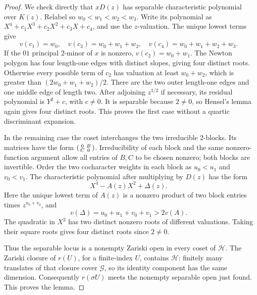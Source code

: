 \begin{proof}
We check directly that \(xD(z)\) has separable characteristic
polynomial over \(K(z)\).
Relabel so \(w_0<w_1<w_2<w_3\).
Write its polynomial as
\(X^4+c_1X^3+c_2X^2+c_3X+c_4\), and use the \(z\)-valuation.
The unique lowest terms give
\[
 v(c_1)=w_0,\quad v(c_3)=w_0+w_1+w_2,\quad
 v(c_4)=w_0+w_1+w_2+w_3.
\]
If the \(01\) principal \(2\)-minor of \(x\) is nonzero,
\(v(c_2)=w_0+w_1\). The Newton polygon has four
length-one edges with distinct slopes, giving four distinct
roots.
Otherwise every possible term of \(c_2\) has valuation at least
\(w_0+w_2\), which is greater than
\((2w_0+w_1+w_2)/2\).
There are the two outer length-one edges and one middle edge
of length two.
After adjoining \(z^{1/2}\) if necessary, its residual
polynomial is \(Y^2+c\), with \(c\ne0\).
It is separable because \(2\ne0\), so Hensel's lemma again
gives four distinct roots.
This proves the first case without a quartic discriminant
expansion.

In the remaining case the coset interchanges the two
irreducible \(2\)-blocks.
Its matrices have the form
\(\begin{psmallmatrix}0&B\\C&0\end{psmallmatrix}\).
Irreducibility of each block and the same nonzero-function
argument allow all entries of \(B,C\) to be chosen nonzero;
both blocks are invertible.
Order the two cocharacter weights in each block as
\(u_0<u_1\) and \(v_0<v_1\).
The characteristic polynomial after multiplying by \(D(z)\)
has the form
\[
 X^4-A(z)X^2+\Delta(z).
\]
Here the unique lowest term of \(A(z)\) is a nonzero product
of two block entries times \(z^{u_0+v_0}\), and
\[
 v(\Delta)=u_0+u_1+v_0+v_1>2v(A).
\]
The quadratic in \(X^2\) has two distinct nonzero roots of
different valuations. Taking their square roots gives four
distinct roots since \(2\ne0\).

Thus the separable locus is a nonempty Zariski open in every
coset of \(\mathcal H\).
The Zariski closure of \(r(U)\), for a finite-index \(U\),
contains \(\mathcal H\): finitely many translates of that
closure cover \(\mathcal G\), so its identity component has
the same dimension.
Consequently \(r(\sigma U)\) meets the nonempty separable
open just found. This proves the lemma.
\end{proof}

